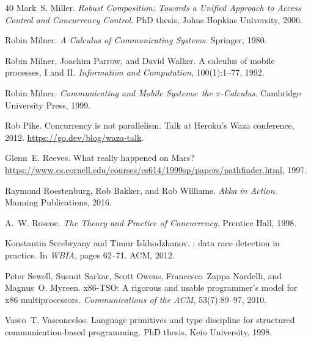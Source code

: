 \documentclass[11pt,a4paper]{article}
\begin{document}
\begin{thebibliography}{40}
Mark~S. Miller.
\newblock \emph{Robust Composition: Towards a Unified Approach to Access Control and Concurrency Control}.
\newblock PhD thesis, Johns Hopkins University, 2006.

Robin Milner.
\newblock \emph{A Calculus of Communicating Systems}.
\newblock Springer, 1980.

Robin Milner, Joachim Parrow, and David Walker.
\newblock A calculus of mobile processes, {I} and {II}.
\newblock \emph{Information and Computation}, 100(1):1--77, 1992.

Robin Milner.
\newblock \emph{Communicating and Mobile Systems: the $\pi$-Calculus}.
\newblock Cambridge University Press, 1999.

Rob Pike.
\newblock Concurrency is not parallelism.
\newblock Talk at Heroku's Waza conference, 2012.
\newblock \url{https://go.dev/blog/waza-talk}.

Glenn~E. Reeves.
\newblock What really happened on {Mars}?
\newblock \url{https://www.cs.cornell.edu/courses/cs614/1999sp/papers/pathfinder.html}, 1997.

Raymond Roestenburg, Rob Bakker, and Rob Williams.
\newblock \emph{Akka in Action}.
\newblock Manning Publications, 2016.

A.~W. Roscoe.
\newblock \emph{The Theory and Practice of Concurrency}.
\newblock Prentice Hall, 1998.

Konstantin Serebryany and Timur Iskhodzhanov.
: data race detection in practice.
\newblock In \emph{WBIA}, pages 62--71. ACM, 2012.

Peter Sewell, Susmit Sarkar, Scott Owens, Francesco~Zappa Nardelli, and Magnus~O. Myreen.
\newblock x86-{TSO}: A rigorous and usable programmer's model for x86 multiprocessors.
\newblock \emph{Communications of the ACM}, 53(7):89--97, 2010.

Vasco~T. Vasconcelos.
\newblock Language primitives and type discipline for structured communication-based programming.
\newblock PhD thesis, Keio University, 1998.


\end{thebibliography}
\end{document}
